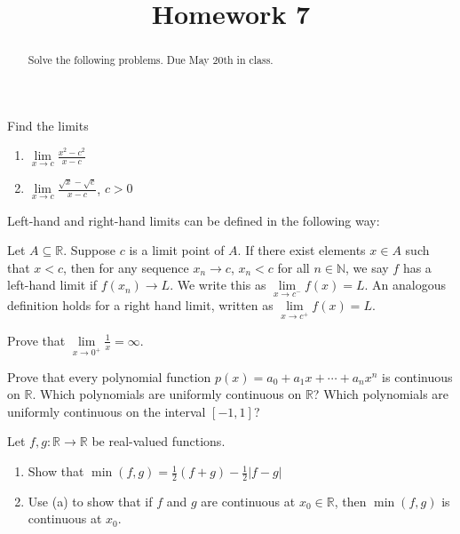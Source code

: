 \documentclass{ximera}
\begin{document}
    \title{Homework 7}
    \begin{abstract} Solve the following problems.  Due May 20th in class. \end{abstract}
    \maketitle

\begin{exercise}
   Find the limits
   \begin{enumerate}
       \item $\lim\limits_{x\to c} \frac{x^2-c^2}{x-c}$
       \item $\lim\limits_{x\to c} \frac{\sqrt{x}-\sqrt{c}}{x-c}$, $c>0$
   \end{enumerate}
\end{exercise}


Left-hand and right-hand limits can be defined in the following way:
\begin{definition}
  Let $A \subseteq \mathbb{R}$.  Suppose $c$ is a limit point of $A$.  If there exist elements $x \in A$ such that $x < c$, then for any sequence $x_n \to c$, $x_n < c$ for all $n \in \mathbb{N}$, we say $f$ has a left-hand limit if $f(x_n) \to L$.  We write this as $\lim\limits_{x\to c^-} f(x) = L$.  An analogous definition holds for a right hand limit, written as $\lim\limits_{x\to c^+} f(x) = L$.
\end{definition}
\begin{exercise}
    Prove that $\lim\limits_{x\to 0^+} \frac{1}x = \infty$.
\end{exercise}

\begin{exercise}
    Prove that every polynomial function $p(x) = a_0 + a_1x + \cdots + a_nx^n$ is continuous on $\mathbb{R}$.  Which polynomials are uniformly continuous on $\mathbb{R}$?  Which polynomials are uniformly continuous on the interval $[-1,1]$?
\end{exercise}

\begin{exercise}
    Let $f,g:\mathbb{R} \to \mathbb{R}$ be real-valued functions.
    \begin{enumerate}
        \item Show that $\min(f,g) = \frac12 (f+g) - \frac12 |f-g|$
        \item Use (a) to show that if $f$ and $g$ are continuous at $x_0 \in \mathbb{R}$, then $\min(f,g)$ is continuous at $x_0$.
    \end{enumerate}
\end{exercise}
\end{document}
